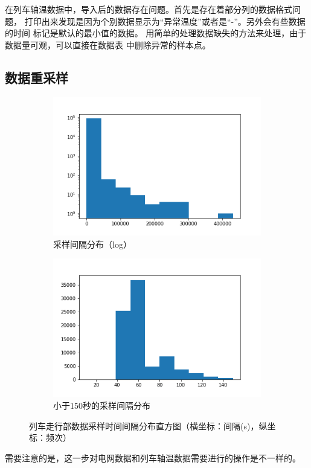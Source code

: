     在列车轴温数据中，导入后的数据存在问题。首先是存在着部分列的数据格式问题，
    打印出来发现是因为个别数据显示为“异常温度”或者是“-”。另外会有些数据的时间
    标记是默认的最小值的数据。
    用简单的处理数据缺失的方法来处理，由于数据量可观，可以直接在数据表
    中删除异常的样本点。

  \subsection{数据重采样}
  \begin{figure}
    \centering
    
    \begin{subfigure}[b]{0.45\textwidth}
        \centering
        \includegraphics[width=\textwidth]{figures/time_intervals_distribution_log.png}
        \caption{采样间隔分布（log）}
        \label{fig:time_interval_log}
    \end{subfigure}
    \hfill
    \begin{subfigure}[b]{0.45\textwidth}
      \centering
      \includegraphics[width=\textwidth]{figures/time_intervals_distribution150.png}
      \caption{小于150秒的采样间隔分布}
      \label{fig:time_interval}
    \end{subfigure}
    
    \caption{列车走行部数据采样时间间隔分布直方图（横坐标：间隔(s)，纵坐标：频次）}
    \label{fig:time intervals}
  \end{figure}
  需要注意的是，这一步对电网数据和列车轴温数据需要进行的操作是不一样的。
  
